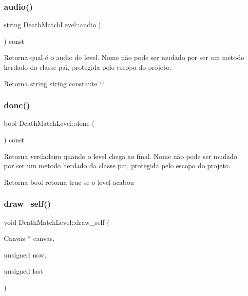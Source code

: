 \subsubsection{\texorpdfstring{audio()}{audio()}}
{\footnotesize\ttfamily string Death\+Match\+Level\+::audio (\begin{DoxyParamCaption}{ }\end{DoxyParamCaption}) const}



Retorna qual é o audio do level. Nome não pode ser mudado por ser um metodo herdado da classe pai, protegida pelo escopo do projeto. 

\begin{DoxyReturn}{Retorna}
string string constante \char`\"{}.\char`\"{} 
\end{DoxyReturn}
\mbox{\label{classDeathMatchLevel_afb51c6bc79031214f50b3cbbe401be9f}} 
\subsubsection{\texorpdfstring{done()}{done()}}
{\footnotesize\ttfamily bool Death\+Match\+Level\+::done (\begin{DoxyParamCaption}{ }\end{DoxyParamCaption}) const}



Retorna verdadeiro quando o level chega ao final. Nome não pode ser mudado por ser um metodo herdado da classe pai, protegida pelo escopo do projeto. 

\begin{DoxyReturn}{Retorna}
bool retorna \textquotesingle{}true\textquotesingle{} se o level acabou 
\end{DoxyReturn}
\mbox{\label{classDeathMatchLevel_a38a915a954f5c8e8ba54c46057bc99d0}} 
\subsubsection{\texorpdfstring{draw\+\_\+self()}{draw\_self()}}
{\footnotesize\ttfamily void Death\+Match\+Level\+::draw\+\_\+self (\begin{DoxyParamCaption}\item[{Canvas $\ast$}]{canvas,  }\item[{unsigned}]{now,  }\item[{unsigned}]{last }\end{DoxyParamCaption})\hspace{0.3cm}{\ttfamily [protected]}}



